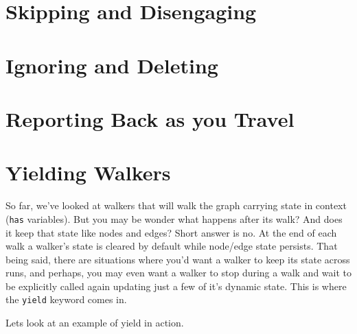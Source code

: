 \section{Skipping and Disengaging}


\par
{}
\par
{}
\par
{}
\par
{}
\par
{}

\section{Ignoring and Deleting}

\par
{}

\par
{}

\section{Reporting Back as you Travel}

\par
{}


\section{Yielding Walkers}

So far, we've looked at walkers that will walk the graph carrying state in context (\lstinline{has} variables).
But you may be wonder what happens after its walk? And does it keep that state like nodes and edges? Short answer is no.
At the end of each walk a walker's state is cleared by default while node/edge state persists.
That being said, there are situations where you'd want a walker to keep its state across runs, and perhaps, you may even want a walker to stop during a walk and wait to be explicitly called again updating just a few of it's dynamic state.
This is where the \lstinline{yield} keyword comes in.
\par
Lets look at an example of yield in action.
\par
{}


